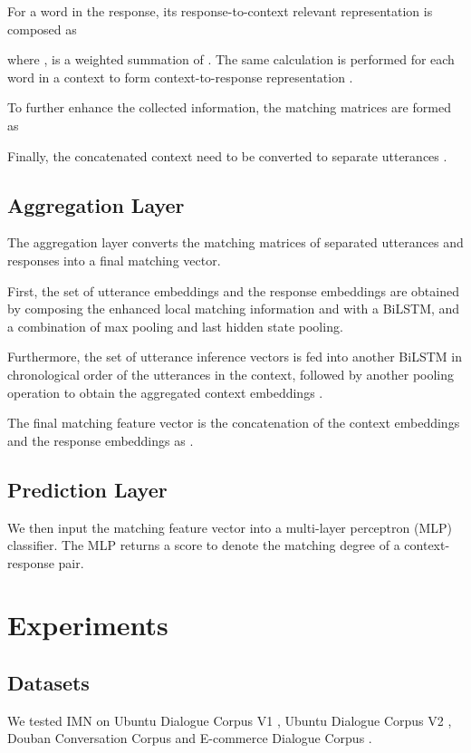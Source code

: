 \documentclass[sigconf]{acmart}
\begin{document}
For a word in the response, its response-to-context relevant representation is composed as
    
    where ,  is a weighted summation of .
The same calculation is performed for each word in a context to form context-to-response representation .


To further enhance the collected information, the matching matrices are formed as
    

    Finally, the concatenated context  need to be converted to separate utterances .

  \subsection{Aggregation Layer}
    The aggregation layer converts the matching matrices of separated utterances and responses into a final matching vector.


    First, the set of utterance embeddings  and the response embeddings  are obtained by composing the enhanced local matching information  and  with a BiLSTM, and a combination of max pooling and last hidden state pooling.

    Furthermore, the set of utterance inference vectors  is fed into another BiLSTM in chronological order of the utterances in the context, followed by another pooling operation to obtain the aggregated context embeddings .

    The final matching feature vector is the concatenation of the context embeddings and the response embeddings as .

  \subsection{Prediction Layer}

    We then input the matching feature vector  into a multi-layer perceptron (MLP) classifier. The MLP returns a score to denote the matching degree of a context-response pair.


\section{Experiments}

  \subsection{Datasets}

    We tested IMN on Ubuntu Dialogue Corpus V1 \cite{DBLP:conf/sigdial/LowePSP15}, Ubuntu Dialogue Corpus V2 \cite{DBLP:journals/dad/LowePSCLP17}, Douban Conversation Corpus \cite{DBLP:conf/acl/WuWXZL17} and E-commerce Dialogue Corpus \cite{DBLP:conf/coling/ZhangLZZL18}.
\end{document}
